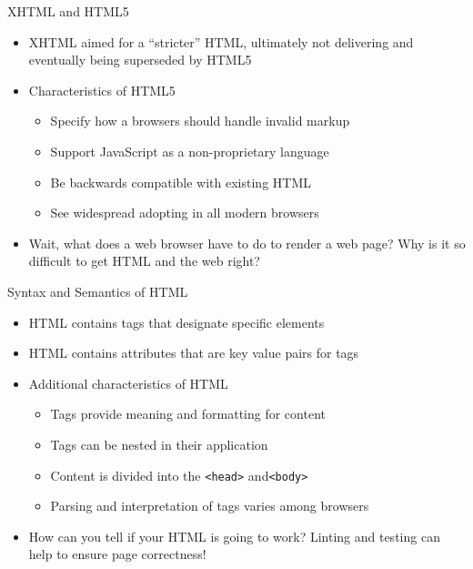 \documentclass[14pt,aspectratio=169]{beamer}
\begin{document}
%
\begin{frame}{XHTML and HTML5}
%
  \begin{itemize}
    \item XHTML aimed for a ``stricter'' HTML, ultimately not delivering and
      eventually being superseded by HTML5
      \vspace*{-.1in}
    \item Characteristics of HTML5
      \begin{itemize}
        \item Specify how a browsers should handle invalid markup
        \item Support JavaScript as a non-proprietary language
        \item Be backwards compatible with existing HTML
        \item See widespread adopting in all modern browsers
      \end{itemize}
      \vspace*{-.1in}
    \item Wait, what does a web browser have to do to render a web page? Why is
      it so difficult to get HTML and the web right?
  \end{itemize}
%
\end{frame}

%
\begin{frame}{Syntax and Semantics of HTML}
%
  \begin{itemize}
    \item HTML contains tags that designate specific elements
      \vspace*{-.1in}
    \item HTML contains attributes that are key value pairs for tags
      \vspace*{-.1in}
    \item Additional characteristics of HTML
      \begin{itemize}
        \item Tags provide meaning and formatting for content
        \item Tags can be nested in their application
        \item Content is divided into the {\tt <head>} and{\tt <body>}
        \item Parsing and interpretation of tags varies among browsers
      \end{itemize}
      \vspace*{-.2in}
    \item How can you tell if your HTML is going to work? Linting and
      testing can help to ensure page correctness!
  \end{itemize}
%
\end{frame}
\end{document}
